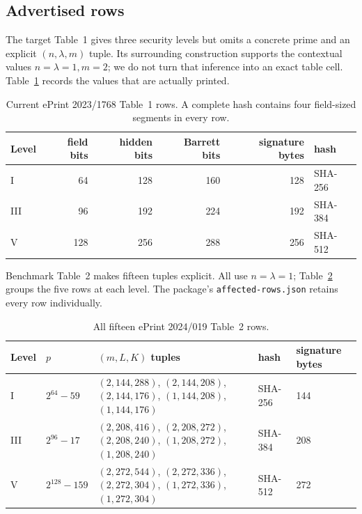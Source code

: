 \documentclass[10pt,a4paper]{article}
\begin{document}
\subsection{Advertised rows}

The target Table~1 gives three security levels but omits a concrete prime and
an explicit $(n,\lambda,m)$ tuple. Its surrounding construction supports the
contextual values $n=\lambda=1,m=2$; we do not turn that inference into an
exact table cell. Table~\ref{tab:targetrows} records the values that are
actually printed.

\begin{table}[ht]
\centering
\small
\begin{tabular}{@{}lrrrrl@{}}
\toprule
Level & field bits & hidden bits & Barrett bits & signature bytes & hash\\
\midrule
I   & 64  & 128 & 160 & 128 & SHA-256\\
III & 96  & 192 & 224 & 192 & SHA-384\\
V   & 128 & 256 & 288 & 256 & SHA-512\\
\bottomrule
\end{tabular}
\caption{Current ePrint 2023/1768 Table~1 rows. A complete hash contains four
field-sized segments in every row.}
\label{tab:targetrows}
\end{table}

Benchmark Table~2 makes fifteen tuples explicit. All use
$n=\lambda=1$; Table~\ref{tab:benchrows} groups the five rows at each level.
The package's \texttt{affected-rows.json} retains every row individually.

\begin{table}[ht]
\centering
\scriptsize
\begin{tabular}{@{}lllll@{}}
\toprule
Level & $p$ & $(m,L,K)$ tuples & hash & signature bytes\\
\midrule
I & $2^{64}-59$ & $(2,144,288)$, $(2,144,208)$, $(2,144,176)$,
  $(1,144,208)$, $(1,144,176)$ & SHA-256 & 144\\
III & $2^{96}-17$ & $(2,208,416)$, $(2,208,272)$, $(2,208,240)$,
  $(1,208,272)$, $(1,208,240)$ & SHA-384 & 208\\
V & $2^{128}-159$ & $(2,272,544)$, $(2,272,336)$, $(2,272,304)$,
  $(1,272,336)$, $(1,272,304)$ & SHA-512 & 272\\
\bottomrule
\end{tabular}
\caption{All fifteen ePrint 2024/019 Table~2 rows.}
\label{tab:benchrows}
\end{table}
\end{document}
